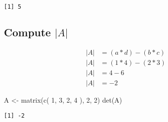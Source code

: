 \documentclass[
  letterpaper,
  DIV=11,
  numbers=noendperiod]{scrartcl}
\newenvironment{Shaded}{\begin{snugshade}}{\end{snugshade}}
\newcommand{\DecValTok}[1]{\textcolor[rgb]{0.68,0.00,0.00}{#1}}
\newcommand{\FunctionTok}[1]{\textcolor[rgb]{0.28,0.35,0.67}{#1}}
\newcommand{\NormalTok}[1]{\textcolor[rgb]{0.00,0.23,0.31}{#1}}
\newcommand{\OtherTok}[1]{\textcolor[rgb]{0.00,0.23,0.31}{#1}}
\begin{document}
\begin{verbatim}
[1] 5
\end{verbatim}

\hypertarget{compute-a-1}{%
\subsection{\texorpdfstring{Compute
\(|A|\)}{Compute \textbar A\textbar{}}}\label{compute-a-1}}

\[
\begin{aligned}
|A| &= (a * d) - (b * c)\\
|A| &= (1*4) - (2 * 3)\\
|A| &= 4-6\\
|A| &=-2
\end{aligned}
\]

\begin{Shaded}
\begin{Highlighting}[]
\NormalTok{A }\OtherTok{\textless{}{-}} \FunctionTok{matrix}\NormalTok{(}\FunctionTok{c}\NormalTok{(}
  \DecValTok{1}\NormalTok{, }\DecValTok{3}\NormalTok{,}
  \DecValTok{2}\NormalTok{, }\DecValTok{4}
\NormalTok{), }\DecValTok{2}\NormalTok{, }\DecValTok{2}\NormalTok{)}
\FunctionTok{det}\NormalTok{(A)}
\end{Highlighting}
\end{Shaded}

\begin{verbatim}
[1] -2
\end{verbatim}
\end{document}
